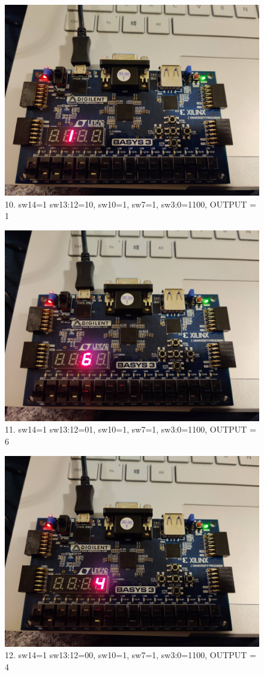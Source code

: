 \documentclass[11pt]{article}
\begin{document}
\begin{figure}[ht]\centering
	\includegraphics[width=.5\textwidth]{board10}
	\caption{10. sw14=1 sw13:12=10, sw10=1, sw7=1, sw3:0=1100, OUTPUT = 1}
	\label{fig:b3_10}			
\end{figure}

\begin{figure}[ht]\centering
	\includegraphics[width=.5\textwidth]{board11}
	\caption{11. sw14=1 sw13:12=01, sw10=1, sw7=1, sw3:0=1100, OUTPUT = 6}
	\label{fig:b3_11}			
\end{figure}

\begin{figure}[ht]\centering
	\includegraphics[width=.5\textwidth]{board12}
	\caption{12. sw14=1 sw13:12=00, sw10=1, sw7=1, sw3:0=1100, OUTPUT = 4}
	\label{fig:b3_12}			
\end{figure}
\end{document}
